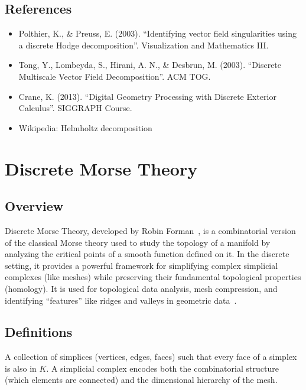 \subsection{References}
\begin{itemize}
    \item Polthier, K., \& Preuss, E. (2003). ``Identifying vector field singularities using a discrete Hodge decomposition''. Visualization and Mathematics III.
    \item Tong, Y., Lombeyda, S., Hirani, A. N., \& Desbrun, M. (2003). ``Discrete Multiscale Vector Field Decomposition''. ACM TOG.
    \item Crane, K. (2013). ``Digital Geometry Processing with Discrete Exterior Calculus''. SIGGRAPH Course.
    \item Wikipedia: Helmholtz decomposition
\end{itemize}


\section{Discrete Morse Theory}
\label{sec:discrete_morse_theory}

\subsection{Overview}
Discrete Morse Theory, developed by Robin Forman~\cite{forman1998,forman2002}, is a combinatorial version of the classical Morse theory used to study the topology of a manifold by analyzing the critical points of a smooth function defined on it. In the discrete setting, it provides a powerful framework for simplifying complex simplicial complexes (like meshes) while preserving their fundamental topological properties (homology). It is used for topological data analysis, mesh compression, and identifying ``features'' like ridges and valleys in geometric data~\cite{gyulassy2008}.

\subsection{Definitions}
\begin{definition}\label{def:simplicial_complex}
A collection of simplices (vertices, edges, faces) such that every face of a simplex is also in $K$. A simplicial complex encodes both the combinatorial structure (which elements are connected) and the dimensional hierarchy of the mesh.
\end{definition}

